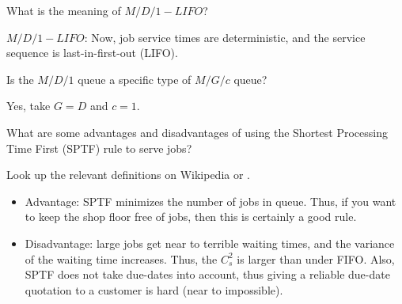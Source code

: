 \begin{exercise}[\faPhoto]
  What is the meaning of $M/D/1-LIFO$?
  \begin{solution}
 $M/D/1-LIFO$:  Now, job service times are deterministic, and the service sequence is last-in-first-out (LIFO).
  \end{solution}
\end{exercise}

\begin{exercise}[\faPhoto]
  Is the $M/D/1$ queue a specific type of  $M/G/c$ queue? 
  \begin{solution}
    Yes, take $G=D$ and $c=1$. 
  \end{solution}
\end{exercise}

\begin{exercise}[\faPhoto]
  What are some advantages and disadvantages of using the Shortest
  Processing Time First (SPTF) rule to serve jobs? 
  \begin{hint}
Look up the relevant
  definitions on Wikipedia or
  \citet{hall91:_queuein_method_servic_manuf}.
  \end{hint}
  \begin{solution}
  \begin{itemize}
  \item Advantage: SPTF minimizes the number of jobs in queue. Thus,
    if you want to keep the shop floor free of jobs, then this is certainly a good rule. 
  \item Disadvantage: large jobs get near to terrible waiting times,
    and the variance of the waiting time increases. Thus, the $C_s^2$
    is larger than under FIFO. Also, SPTF does not take due-dates into
    account, thus giving a reliable due-date quotation to a customer is
    hard (near to impossible).
  \end{itemize}
  \end{solution}
\end{exercise}





